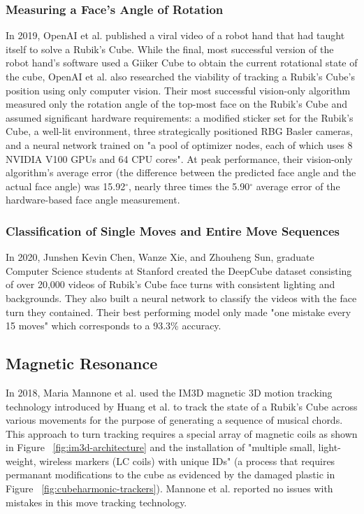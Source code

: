 \subsubsection{Measuring a Face's Angle of Rotation}
In 2019, OpenAI et al. published a viral video of a robot hand that had taught itself to solve a Rubik's Cube.
While the final, most successful version of the robot hand's software used a Giiker Cube to obtain the current rotational state of the cube, OpenAI et al. also researched the viability of tracking a Rubik's Cube's position using only computer vision.
Their most successful vision-only algorithm measured only the rotation angle of the top-most face on the Rubik's Cube and assumed significant hardware requirements: a modified sticker set for the Rubik's Cube, a well-lit environment, three strategically positioned RBG Basler cameras, and a neural network trained on "a pool of optimizer nodes, each of which uses 8 NVIDIA V100 GPUs and 64 CPU cores".
At peak performance, their vision-only algorithm's average error (the difference between the predicted face angle and the actual face angle) was 15.92$^\circ$, nearly three times the 5.90$^\circ$ average error of the hardware-based face angle measurement. \cite{openai2019rubiks}

\subsubsection{Classification of Single Moves and Entire Move Sequences}
In 2020, Junshen Kevin Chen, Wanze Xie, and Zhouheng Sun, graduate Computer Science students at Stanford created the DeepCube dataset consisting of over 20,000 videos of Rubik's Cube face turns with consistent lighting and backgrounds. 
They also built a neural network to classify the videos with the face turn they contained.
Their best performing model only made "one mistake every 15 moves" which corresponds to a 93.3\% accuracy. \cite{chendeepcube}


\subsection{Magnetic Resonance}
In 2018, Maria Mannone et al. used the IM3D magnetic 3D motion tracking technology introduced by Huang et al. \cite{im3d} to track the state of a Rubik's Cube across various movements for the purpose of generating a sequence of musical chords.
This approach to turn tracking requires a special array of magnetic coils as shown in Figure ~\ref{fig:im3d-architecture} and the installation of "multiple small, light-
weight, wireless markers (LC coils) with unique IDs" (a process that requires permanant modifications to the cube as evidenced by the damaged plastic in Figure ~\ref{fig:cubeharmonic-trackers}).
Mannone et al. reported no issues with mistakes in this move tracking technology. \cite{mannone-cubeharmonic-2018}

